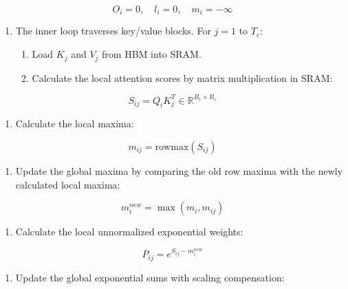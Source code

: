 \[
O_i = 0,\quad l_i = 0,\quad m_i = -\infty
\]

\begin{enumerate}
\def\labelenumi{\arabic{enumi}.}
\setcounter{enumi}{2}
\item
{}
  The inner loop traverses key/value blocks. For \(j = 1\) to \(T_c\):

  \begin{enumerate}
  \def\labelenumii{\arabic{enumii}.}
  \tightlist
  \item
    Load \(K_j\) and \(V_j\) from HBM into SRAM.
  \item
{}
    Calculate the local attention scores by matrix multiplication in SRAM:
  \end{enumerate}
\end{enumerate}

\[
S_{ij} = Q_iK_j^T \in \mathbb{R}^{B_r \times B_c}
\]

\begin{enumerate}
\def\labelenumi{\arabic{enumi}.}
\setcounter{enumi}{2}
\tightlist
\item
{}
  Calculate the local maxima:
\end{enumerate}

\[
m_{ij} = \mathrm{rowmax}(S_{ij})
\]

\begin{enumerate}
\def\labelenumi{\arabic{enumi}.}
\setcounter{enumi}{3}
\tightlist
\item
{}
  Update the global maxima by comparing the old row maxima with the newly calculated local maxima:
\end{enumerate}

\[
m_i^{new} = \max(m_i,m_{ij})
\]

\begin{enumerate}
\def\labelenumi{\arabic{enumi}.}
\setcounter{enumi}{4}
\tightlist
\item
{}
  Calculate the local unnormalized exponential weights:
\end{enumerate}

\[
P_{ij} = e^{S_{ij}-m_i^{new}}
\]

\begin{enumerate}
\def\labelenumi{\arabic{enumi}.}
\setcounter{enumi}{5}
\tightlist
\item
{}
  Update the global exponential sums with scaling compensation:
\end{enumerate}

